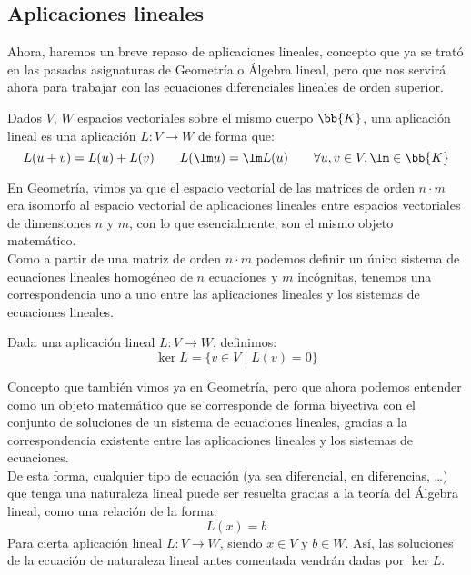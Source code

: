 \subsection{Aplicaciones lineales}\label{sec:aplicaciones_lineales}
Ahora, haremos un breve repaso de aplicaciones lineales, concepto que ya se trató en las pasadas asignaturas de Geometría o Álgebra lineal, pero que nos servirá ahora para trabajar con las ecuaciones diferenciales lineales de orden superior.
\begin{definicion}
    Dados $V$, $W$ espacios vectoriales sobre el mismo cuerpo $\bb{K}$, una aplicación lineal es una aplicación $L:V\rightarrow W$ de forma que:
\begin{equation*}
    L(u + v) = L(u) + L(v) \qquad L(\lm u) = \lm L(u) \qquad \forall u,v\in V, \lm \in \bb{K}
\end{equation*}
\end{definicion}
En Geometría, vimos ya que el espacio vectorial de las matrices de orden $n\cdot m$ era isomorfo al espacio vectorial de aplicaciones lineales entre espacios vectoriales de dimensiones $n$ y $m$, con lo que esencialmente, son el mismo objeto matemático.\\

Como a partir de una matriz de orden $n\cdot m$ podemos definir un único sistema de ecuaciones lineales homogéneo de $n$ ecuaciones y $m$ incógnitas, tenemos una correspondencia uno a uno entre las aplicaciones lineales y los sistemas de ecuaciones lineales.

\begin{definicion}[Núcleo]
    Dada una aplicación lineal $L:V\rightarrow W$, definimos:
    \begin{equation*}
        \ker L = \{v\in V \mid L(v) = 0\}
    \end{equation*}
\end{definicion}
Concepto que también vimos ya en Geometría, pero que ahora podemos entender como un objeto matemático que se corresponde de forma biyectiva con el conjunto de soluciones de un sistema de ecuaciones lineales, gracias a la correspondencia existente entre las aplicaciones lineales y los sistemas de ecuaciones.\\

De esta forma, cualquier tipo de ecuación (ya sea diferencial, en diferencias, \ldots) que tenga una naturaleza lineal puede ser resuelta gracias a la teoría del Álgebra lineal, como una relación de la forma:
\begin{equation*}
    L(x) = b
\end{equation*}
Para cierta aplicación lineal $L:V\rightarrow W$, siendo $x\in V$ y $b\in W$. Así, las soluciones de la ecuación de naturaleza lineal antes comentada vendrán dadas por $\ker L$.

